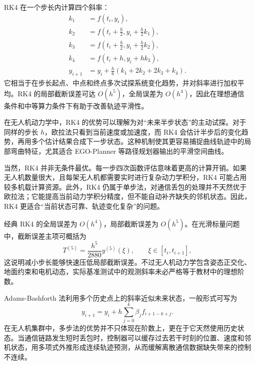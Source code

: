 \documentclass[UTF8,zihao=-4]{ctexart}
\begin{document}
RK4 在一个步长内计算四个斜率：
\begin{equation}
\begin{aligned}
  k_1 &= f(t_i,y_i),\\
  k_2 &= f(t_i+\frac{h}{2},y_i+\frac{h}{2}k_1),\\
  k_3 &= f(t_i+\frac{h}{2},y_i+\frac{h}{2}k_2),\\
  k_4 &= f(t_i+h,y_i+h k_3),\\
  y_{i+1} &= y_i+\frac{h}{6}(k_1+2k_2+2k_3+k_4).
\end{aligned}
\label{eq:rk4}
\end{equation}
它相当于在步长起点、中点和终点多次试探系统变化趋势，并对斜率进行加权平均。RK4 的局部截断误差可达 $O(h^5)$，全局误差为 $O(h^4)$，因此在理想通信条件和中等算力条件下有助于改善轨迹平滑性。

在无人机动力学中，RK4 的优势可以理解为对“未来半步状态”的主动试探。对于同样的步长 $h$，欧拉法只看到当前速度或加速度，而 RK4 会估计半步后的变化趋势，再用多个估计结果合成下一步状态。这种机制使其更容易捕捉曲线轨迹中的局部弯曲特征，尤其适合 EGO-Planner 等路径规划器输出的平滑空间曲线。

当然，RK4 并非无条件最优。每一步四次函数评估意味着更高的计算开销。如果无人机数量很大，且每架无人机都需要实时进行复杂动力学积分，RK4 可能占用较多机载计算资源。此外，RK4 仍属于单步法，对通信丢包的处理并不天然优于欧拉法；它能提高当前动力学积分精度，但不能自动补齐缺失的邻机状态。因此，RK4 更适合“当前状态可靠、轨迹变化复杂”的问题。

经典 RK4 的全局误差为 $O(h^4)$，局部截断误差为 $O(h^5)$。在光滑标量问题中，截断误差主项可概括为
\begin{equation}
  T^{(5)}=\frac{h^5}{2880}y^{(5)}(\xi),\qquad \xi\in[t_i,t_{i+1}],
  \label{eq:rk4-local-error}
\end{equation}
这说明减小步长能够快速压低局部截断误差。不过无人机动力学包含姿态正交化、地面约束和电机动态，实际基准测试中的观测斜率未必严格等于教材中的理想阶数。

\par
Adams-Bashforth 法利用多个历史点上的斜率近似未来状态，一般形式可写为
\begin{equation}
  y_{i+1}=y_i+h\sum_{j=0}^{k}\beta_j f_{i+1-k+j}.
  \label{eq:adams}
\end{equation}
在无人机集群中，多步法的优势并不只体现在阶数上，更在于它天然使用历史状态。当通信链路发生短时丢包时，控制器可以缓存过去若干时刻的位置、速度和邻机状态，用多项式外推形成连续轨迹预测，从而缓解离散通信数据缺失带来的控制不连续。
\end{document}
